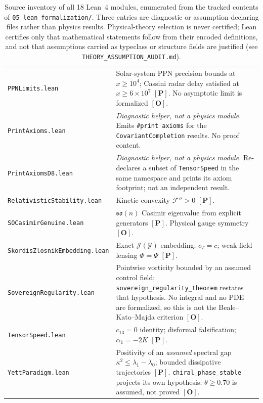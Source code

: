 \documentclass[aps,prd,preprint,superscriptaddress,nofootinbib,amsmath,amssymb,floatfix]{revtex4-2}
\begin{document}
\begin{table}[t]
\begin{tabularx}{\textwidth}{@{}l X@{}}
\texttt{PPNLimits.lean} & Solar-system PPN precision bounds at $x \ge 10^4$; Cassini radar delay satisfied at $x \ge 6\times10^7$ $\mathbf{[P]}$. No asymptotic limit is formalized $\mathbf{[O]}$. \\
\texttt{PrintAxioms.lean} & \emph{Diagnostic helper, not a physics module.} Emits \texttt{\#print axioms} for the \texttt{CovariantCompletion} results. No proof content. \\
\texttt{PrintAxiomsD8.lean} & \emph{Diagnostic helper, not a physics module.} Re-declares a subset of \texttt{TensorSpeed} in the same namespace and prints its axiom footprint; not an independent result. \\
\texttt{RelativisticStability.lean} & Kinetic convexity $\mathcal{F}'' > 0$ $\mathbf{[P]}$. \\
\texttt{SOCasimirGenuine.lean} & $\mathfrak{so}(n)$ Casimir eigenvalue from explicit generators $\mathbf{[P]}$. Physical gauge symmetry $\mathbf{[O]}$. \\
\texttt{SkordisZlosnikEmbedding.lean} & Exact $\mathcal{J}(\mathcal{Y})$ embedding; $c_T = c$; weak-field lensing $\Phi = \Psi$ $\mathbf{[P]}$. \\
\texttt{SovereignRegularity.lean} & Pointwise vorticity bounded by an assumed control field; \texttt{sovereign\_regularity\_theorem} restates that hypothesis. No integral and no PDE are formalized, so this is not the Beale--Kato--Majda criterion \cite{BealeKatoMajda1984} $\mathbf{[O]}$. \\
\texttt{TensorSpeed.lean} & $c_{13} = 0$ identity; disformal falsification; $\alpha_1 = -2K$ $\mathbf{[P]}$. \\
\texttt{YettParadigm.lean} & Positivity of an \emph{assumed} spectral gap $\kappa^2 \le \lambda_1-\lambda_0$; bounded dissipative trajectories $\mathbf{[P]}$. \texttt{chiral\_phase\_stable} projects its own hypothesis: $\theta \ge 0.70$ is assumed, not proved $\mathbf{[O]}$. \\
\bottomrule
\end{tabularx}
\caption{Source inventory of all 18 Lean~4 modules, enumerated from the tracked contents of \texttt{05\_lean\_formalization/}. Three entries are diagnostic or assumption-declaring files rather than physics results. Physical-theory selection is never certified; Lean certifies only that mathematical statements follow from their encoded definitions, and not that assumptions carried as typeclass or structure fields are justified (see \texttt{THEORY\_ASSUMPTION\_AUDIT.md}).}
\label{tab:lean_modules}
\end{table}
\end{document}
